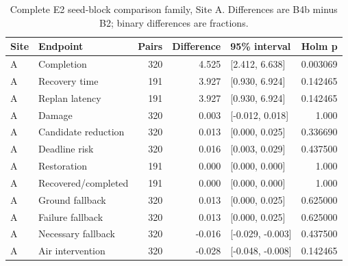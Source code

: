 \begin{table}[H]\centering\footnotesize
\caption{Complete E2 seed-block comparison family, Site A. Differences are B4b minus B2; binary differences are fractions.}\label{tab:e2_A}
\begin{tabularx}{\textwidth}{@{}lYrrYr@{}}\toprule
Site & Endpoint & Pairs & Difference & 95\% interval & Holm p \\\midrule
A & Completion & 320 & 4.525 & [2.412, 6.638] & 0.003069 \\
A & Recovery time & 191 & 3.927 & [0.930, 6.924] & 0.142465 \\
A & Replan latency & 191 & 3.927 & [0.930, 6.924] & 0.142465 \\
A & Damage & 320 & 0.003 & [-0.012, 0.018] & 1.000 \\
A & Candidate reduction & 320 & 0.013 & [0.000, 0.025] & 0.336690 \\
A & Deadline risk & 320 & 0.016 & [0.003, 0.029] & 0.437500 \\
A & Restoration & 191 & 0.000 & [0.000, 0.000] & 1.000 \\
A & Recovered/completed & 191 & 0.000 & [0.000, 0.000] & 1.000 \\
A & Ground fallback & 320 & 0.013 & [0.000, 0.025] & 0.625000 \\
A & Failure fallback & 320 & 0.013 & [0.000, 0.025] & 0.625000 \\
A & Necessary fallback & 320 & -0.016 & [-0.029, -0.003] & 0.437500 \\
A & Air intervention & 320 & -0.028 & [-0.048, -0.008] & 0.142465 \\
\bottomrule\end{tabularx}\end{table}
